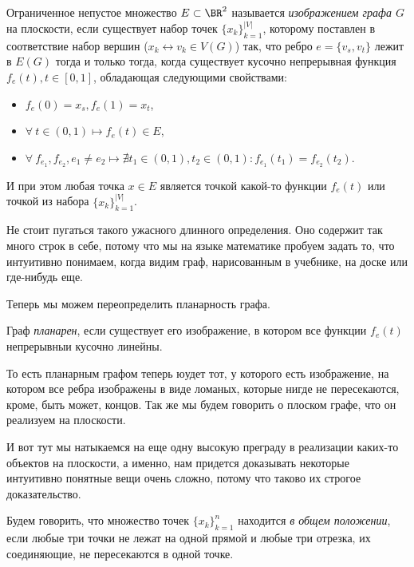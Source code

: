 \begin{definition}
	Ограниченное непустое множество $E \subset \BR^2$ называется \emph{изображением графа $G$} на плоскости, если существует набор точек $\lbrace x_k \rbrace_{k=1}^{|V|}$, которому поставлен в соответствие набор вершин ($x_k \leftrightarrow v_k \in V(G)$) так, что ребро $e = \lbrace v_s, v_t \rbrace$ лежит в $E(G)$ тогда и только тогда, когда существует кусочно непрерывная функция $f_e(t), t \in [0, 1]$, обладающая следующими свойствами:
\begin{itemize}
	\item $f_e(0) = x_s, f_e(1) = x_t$,
	\item $\forall \!\ t \in (0, 1) \mapsto f_e(t) \in E$,
	\item $\forall \!\ f_{e_1}, f_{e_2}, e_1 \neq e_2 \mapsto \nexists t_1  \in (0, 1), t_2 \in (0, 1) \colon f_{e_1}(t_1) = f_{e_2}(t_2)$.
\end{itemize}
	И при этом любая точка $x \in E$ является точкой какой-то функции $f_e(t)$ или точкой из набора $\lbrace x_k \rbrace_{k=1}^{|V|}$.
\end{definition}

	Не стоит пугаться такого ужасного длинного определения. Оно содержит так много строк в себе, потому что мы на языке математике пробуем задать то, что интуитивно понимаем, когда видим граф, нарисованным в учебнике, на доске или где-нибудь еще.

	Теперь мы можем переопределить планарность графа.
	
\begin{definition}
	Граф \emph{планарен}, если существует его изображение, в котором все функции $f_e(t)$ непрерывныи кусочно линейны.
\end{definition}

	То есть планарным графом теперь юудет тот, у которого есть изображение, на котором все ребра изображены в виде ломаных, которые нигде не пересекаются, кроме, быть может, концов. Так же мы будем говорить о плоском графе, что он реализуем на плоскости.


	И вот тут мы натыкаемся на еще одну высокую преграду в реализации каких-то объектов на плоскости, а именно, нам придется доказывать некоторые интуитивно понятные вещи очень сложно, потому что таково их строгое доказательство.

\begin{definition}
	Будем говорить, что множество точек $\lbrace x_k \rbrace_{k = 1}^{n}$ находится \emph{в общем положении}, если любые три точки не лежат на одной прямой и любые три отрезка, их соединяющие, не пересекаются в одной точке.
\end{definition}

